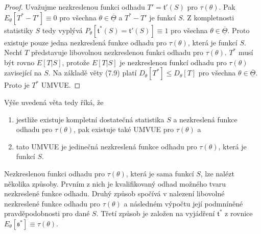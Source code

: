 \begin{proof}
Uvažujme nezkreslenou funkci odhadu $T' = \mathfrak{t}'(S)$ pro $\tau(\theta)$. Pak $E_{\theta}[T^* - T'] \equiv 0$ pro všechna $\theta \in \overline{\underline{\Theta}}$ a $T^* - T'$ je funkcí $S$. Z kompletnosti statistiky $S$ tedy vyplývá $P_{\theta}[\mathfrak{t}^*(S) = \mathfrak{t}'(S)] \equiv 1$ pro všechna $\theta \in \overline{\underline{\Theta}}$. Proto existuje pouze jedna nezkreslená funkce odhadu pro $\tau(\theta)$, která je funkcí $S$. Nechť $T$ představuje libovolnou nezkreslenou funkci odhadu pro $\tau(\theta)$. $T^*$ musí být rovno $E[T|S]$, protože $E[T|S]$ je nezkreslenou funkcí odhadu pro $\tau(\theta)$ zavisející na $S$. Na základě věty (7.9) platí $D_{\theta}[T^*] \le D_{\theta}[T]$ pro všechna $\theta \in \overline{\underline{\Theta}}$. Proto je $T^*$ UMVUE.
\end{proof}

Výše uvedená věta tedy říká, že
\begin{enumerate}
\item jestliže existuje kompletní dostatečná statistika $S$ a nezkreslená funkce odhadu pro $\tau(\theta)$, pak existuje také UMVUE pro $\tau(\theta)$ a
\item tato UMVUE je jedinečná nezkreslená funkce odhadu pro $\tau(\theta)$, která je funkcí $S$.
\end{enumerate}

Nezkreslenou funkci odhadu pro $\tau(\theta)$, která je sama funkcí $S$, lze nalézt několika způsoby. Prvním z nich je kvalifikovaný odhad možného tvaru nezkreslené funkce odhadu. Druhý způsob spočívá v nalezení libovolné nezkreslené funkce odhadu pro $\tau(\theta)$ a následném výpočtu její podmníněné pravděpodobnosti pro dané $S$. Třetí způsob je založen na vyjádření $\mathfrak{t}^*$ z rovnice $E_{\theta}[\mathfrak{s}^*] \equiv \tau(\theta)$.

